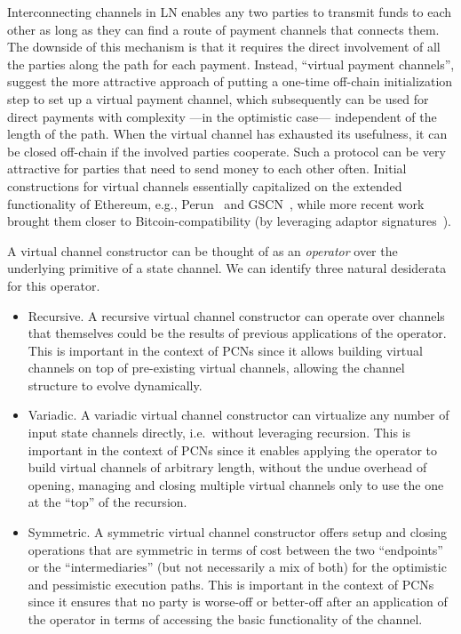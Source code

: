 Interconnecting channels in LN enables any two parties to transmit funds
to each other as long as they can find a route of payment channels that connects
them. The downside of this mechanism is that it requires the direct involvement
of all the parties along the path for each payment. Instead, ``virtual payment
channels'', suggest the more attractive approach of putting a one-time off-chain
initialization step to set up a virtual payment channel, which subsequently can
be used for direct payments with complexity ---in the optimistic case---
independent of the length of the path. When the virtual channel has exhausted
its usefulness, it can be closed off-chain if the involved parties cooperate. Such a
protocol can be very attractive for parties that need to send money to each
other often.
Initial constructions for virtual channels essentially capitalized on the extended functionality of Ethereum, e.g.,
Perun~\cite{perun} and GSCN~\cite{DBLP:conf/ccs/DziembowskiFH18}, while more
recent work~\cite{9519487} brought them closer to
Bitcoin-compatibility (by leveraging adaptor
signatures~\cite{DBLP:journals/iacr/AumayrEEFHMMR20}).

A virtual channel constructor can be thought of as an \emph{operator} over the
underlying primitive of a state channel. We can identify three natural
desiderata for this operator.

\begin{itemize}
\item Recursive. A recursive virtual channel constructor can operate over
channels that themselves could be the results of previous applications of the
operator. This is important in the context of PCNs since it allows building
virtual channels on top of pre-existing virtual channels, allowing the channel
structure to evolve dynamically.
\item Variadic. A variadic virtual channel constructor can virtualize any number
of input state channels directly, i.e.\ without leveraging recursion. This is
important in the context of PCNs since it enables applying the operator to build
virtual channels of arbitrary length, without the undue overhead of opening,
managing and closing multiple virtual channels only to use the one at the
``top'' of the recursion.
\item Symmetric. A symmetric virtual channel constructor offers setup and
closing operations that are symmetric in terms of cost between the two
``endpoints'' or the ``intermediaries'' (but not necessarily a mix of both) for the optimistic and pessimistic execution paths. This is important in the context of PCNs since it ensures that no party is worse-off or better-off after an application of the operator in terms of accessing the basic functionality of the channel. 
\end{itemize}

